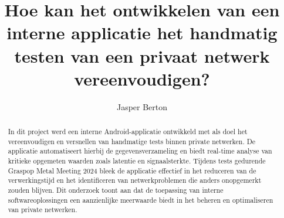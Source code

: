 \documentclass[a0,portrait]{hogent-poster}
\title{Hoe kan het ontwikkelen van een interne applicatie het handmatig testen van een privaat netwerk vereenvoudigen?}
\author{Jasper Berton}
\begin{document}
\maketitle

\begin{abstract}
In dit project werd een interne Android-applicatie ontwikkeld met als doel het vereenvoudigen en versnellen van handmatige tests binnen private netwerken. De applicatie automatiseert hierbij de gegevensverzameling en biedt real-time analyse van kritieke opgemeten waarden zoals latentie en signaalsterkte. Tijdens tests gedurende Graspop Metal Meeting 2024 bleek de applicatie effectief in het reduceren van de verwerkingstijd en het identificeren van netwerkproblemen die anders onopgemerkt zouden blijven. Dit onderzoek toont aan dat de toepassing van interne softwareoplossingen een aanzienlijke meerwaarde biedt in het beheren en optimaliseren van private netwerken.
\end{abstract}
\end{document}
